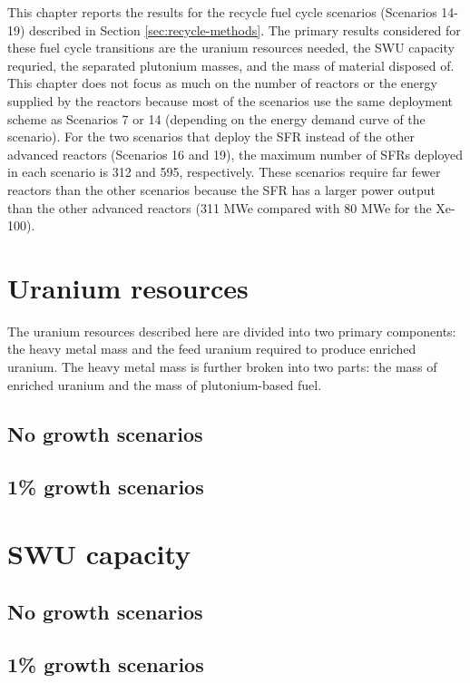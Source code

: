 This chapter reports the results for the recycle fuel cycle 
scenarios (Scenarios 14-19) described 
in Section \ref{sec:recycle-methods}. The primary results considered 
for these fuel cycle transitions are the uranium resources needed, 
the \gls{SWU} capacity requried, the separated plutonium masses, 
and the mass of material disposed of. This chapter does not focus 
as much on the number of reactors or the energy supplied by 
the reactors because most of the scenarios use the same 
deployment scheme as Scenarios 7 or 14 (depending on 
the energy demand curve of the scenario). For the two 
scenarios that deploy the \gls{SFR} instead of the other 
advanced reactors (Scenarios 16 and 19), the maximum number 
of \glspl{SFR} deployed in each scenario is 312 and 595, 
respectively. 
These scenarios require far fewer reactors than the other scenarios 
because the \gls{SFR} has a larger power output than the other 
advanced reactors (311 MWe compared with 80 MWe for the Xe-100).

\section{Uranium resources}
The uranium resources described here are divided into two primary 
components: the heavy metal mass and the feed uranium required 
to produce enriched uranium. The heavy metal mass is further 
broken into two parts: the mass of enriched uranium and the 
mass of plutonium-based fuel. 

\subsection{No growth scenarios}

\subsection{1\% growth scenarios}

\section{SWU capacity}

\subsection{No growth scenarios}

\subsection{1\% growth scenarios}

